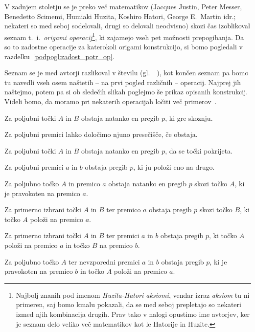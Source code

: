 V zadnjem stoletju se je preko več matematikov (Jacques Justin, Peter Messer, Benedetto Scimemi, Humiaki Huzita, Koshiro Hatori, George E.\ Martin idr.; nekateri so med seboj sodelovali, drugi so delovali neodvisno) skozi čas izoblikoval seznam t.\ i.\ \emph{origami operacij}\footnote{Najbolj znanih pod imenom \emph{Huzita-Hatori aksiomi}, vendar izraz \emph{aksiom} tu ni primeren, saj bomo kmalu pokazali, da se med seboj prepletajo so nekateri izmed njih kombinacija drugih. Prav tako v nalogi opustimo ime avtorjev, ker je seznam delo veliko več matematikov kot le Hatorije in Huzite.}, ki zajamejo vseh pet možnosti prepogibanja. Da so to zadostne operacije za katerokoli origami konstrukcijo, si bomo pogledali v razdelku~\ref{podpogl:zadost_potr_op}.

Seznam se je med avtorji razlikoval v številu (gl.\ ~\cite[str.\ 29--30]{hull2020}), kot končen seznam pa bomo tu navedli vseh osem naštetih -- na prvi pogled različnih -- operacij. Najprej jih naštejmo, potem pa si ob sledečih slikah poglejmo še prikaz opisanih konstrukcij. Videli bomo, da moramo pri nekaterih operacijah ločiti več primerov~\cite{michael2005, zore2022}.

\renewcommand{\theoperacija}{O\arabic{operacija}}

\begin{operacija}
    \label{op:O1}
    Za poljubni točki $A$ in $B$ obstaja natanko en pregib $p$, ki gre skoznju.
\end{operacija}
\begin{operacija}
    \label{op:O2}
    Za poljubni premici lahko določimo njuno presečišče, če obstaja.
\end{operacija}
\begin{operacija}
    \label{op:O3}
    Za poljubni točki $A$ in $B$ obstaja natanko en pregib $p$, da se točki pokrijeta.
\end{operacija}
\begin{operacija}
    \label{op:O4}
    Za poljubni premici $a$ in $b$ obstaja pregib $p$, ki ju položi eno na drugo.
\end{operacija}
\begin{operacija}
    \label{op:O5}
    Za poljubno točko $A$ in premico $a$ obstaja natanko en pregib $p$ skozi točko $A$, ki je pravokoten na premico $a$.
\end{operacija}
\begin{operacija}
    \label{op:O6}
    Za primerno izbrani točki $A$ in $B$ ter premico $a$ obstaja pregib $p$ skozi točko $B$, ki točko $A$ položi na premico $a$.
\end{operacija}
\begin{operacija}
    \label{op:O7}
    Za primerno izbrani točki $A$ in $B$ ter premici $a$ in $b$ obstaja pregib $p$, ki točko $A$ položi na premico $a$ in točko $B$ na premico $b$.
\end{operacija}
\begin{operacija}
    \label{op:O8}
    Za poljubno točko $A$ ter nevzporedni premici $a$ in $b$ obstaja pregib $p$, ki je pravokoten na premico $b$ in točko $A$ položi na premico $a$.
\end{operacija}

